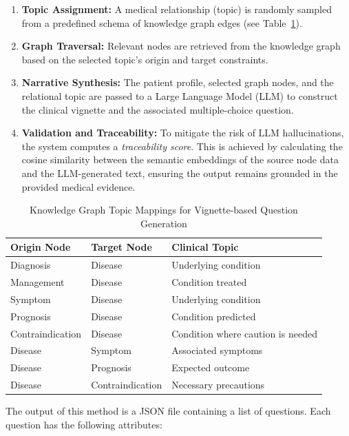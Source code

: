\begin{enumerate} 
\item \textbf{Topic Assignment:} A medical relationship (topic) is randomly sampled from a predefined schema of knowledge graph edges (see Table~\ref{tab:vin_topics}).
\item \textbf{Graph Traversal:} Relevant nodes are retrieved from the knowledge graph based on the selected topic's origin and target constraints.
\item \textbf{Narrative Synthesis:} The patient profile, selected graph nodes, and the relational topic are passed to a Large Language Model (LLM) to construct the clinical vignette and the associated multiple-choice question.
\item \textbf{Validation and Traceability:} To mitigate the risk of LLM hallucinations, the system computes a \textit{traceability score}. This is achieved by calculating the cosine similarity between the semantic embeddings of the source node data and the LLM-generated text, ensuring the output remains grounded in the provided medical evidence.
\end{enumerate}

\begin{table}
\raggedright
\caption{Knowledge Graph Topic Mappings for Vignette-based Question Generation}
\label{tab:vin_topics}
\begin{tabular}{|l|l|l|}
\hline
\textbf{Origin Node} & \textbf{Target Node} & \textbf{Clinical Topic} \\ \hline
Diagnosis & Disease & Underlying condition \\ \hline
Management & Disease & Condition treated \\ \hline
Symptom & Disease & Underlying condition \\ \hline
Prognosis & Disease & Condition predicted \\ \hline
Contraindication & Disease & Condition where caution is needed \\ \hline
Disease & Symptom & Associated symptoms \\ \hline
Disease & Prognosis & Expected outcome \\ \hline
Disease & Contraindication & Necessary precautions \\ \hline
\end{tabular}
\end{table}

The output of this method is a JSON file containing a list of questions. Each question has the following attributes:

